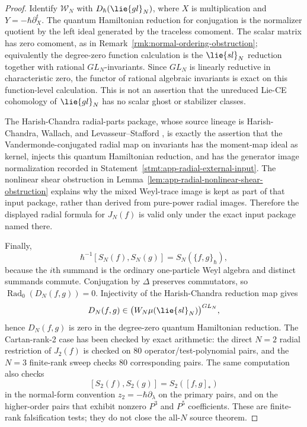 \documentclass[11pt]{memoir}
\begin{document}
\begin{proof}
  Identify $\mathcal W_N$ with
  $\mathcal D_\hbar(\lie{gl}_N)$, where $X$ is multiplication and
  $Y=-\hbar\partial_X^t$. The quantum Hamiltonian reduction for conjugation is
  the normalizer quotient by the left ideal generated by the traceless
  comoment. The scalar matrix has zero comoment, as in
  Remark~\ref{rmk:normal-ordering-obstruction}; equivalently the degree-zero
  function calculation is the $\lie{sl}_N$ reduction together with rational
  $GL_N$-invariants. Since $GL_N$ is linearly reductive in characteristic
  zero, the functor of rational algebraic invariants is exact on this
  function-level calculation.  This is not an assertion that the unreduced
  Lie-CE cohomology of \(\lie{gl}_N\) has no scalar ghost or stabilizer
  classes.

  The Harish-Chandra radial-parts package, whose source lineage is
  Harish-Chandra, Wallach, and Levasseur--Stafford
  \cites{harish-chandra-invariant-differential-operators,wallach-reductive-invariant-differential,levasseur-stafford-harish-chandra,levasseur-stafford-kernel-harish-chandra},
  is exactly the assertion that the Vandermonde-conjugated radial map on
  invariants has the moment-map ideal as kernel, injects this quantum
  Hamiltonian reduction, and has the generator image normalization
	  recorded in Statement~\ref{stmt:app-radial-external-input}.  The
	  nonlinear shear obstruction in
	  Lemma~\ref{lem:app-radial-nonlinear-shear-obstruction} explains why
	  the mixed Weyl-trace image is kept as part of that input package,
	  rather than derived from pure-power radial images. Therefore the
	  displayed radial formula for \(J_N(f)\) is valid only under the exact
	  input package named there.

  Finally,
  $$\hbar^{-1}[S_N(f),S_N(g)]=S_N(\{f,g\}_\hbar),$$
  because the $i$th summand is the ordinary one-particle Weyl algebra and
  distinct summands commute. Conjugation by $\Delta$ preserves commutators, so
  $\operatorname{Rad}_0(D_N(f,g))=0$. Injectivity of the Harish-Chandra
  reduction map gives
  $$D_N(f,g)\in
    \bigl(\mathcal W_N\widehat\mu(\lie{sl}_N)\bigr)^{GL_N},$$
  hence $D_N(f,g)$ is zero in the degree-zero quantum Hamiltonian reduction.
  The Cartan-rank-2 case has been checked by exact arithmetic: the direct
  \(N=2\) radial restriction of \(J_2(f)\) is checked on \(80\)
  operator/test-polynomial pairs, and the \(N=3\) finite-rank sweep checks
  \(80\) corresponding pairs.  The same computation also checks
  $$[S_2(f),S_2(g)]=S_2([f,g]_*)$$
  in the normal-form convention \(z_2=-\hbar\partial_\lambda\) on the
  primary pairs, and on the higher-order pairs that exhibit nonzero
  \(P^3\) and \(P^5\) coefficients.  These are finite-rank
  falsification tests; they do not
  close the all-\(N\) source theorem.


\end{proof}
\end{document}
